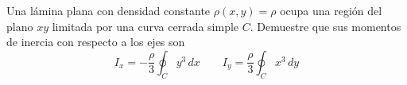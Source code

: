 \item Una lámina plana con densidad constante $\rho(x, y) = \rho$ ocupa una región del plano $xy$ limitada por una curva cerrada simple $C$. Demuestre que sus momentos de inercia con respecto a los ejes son
    \[ I_x = -\frac{\rho}{3} \oint_C y^3 \, dx \qquad I_y = \frac{\rho}{3} \oint_C x^3 \, dy \]

